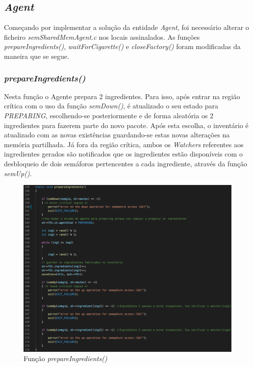 \documentclass[10pt,portuguese]{article}
\begin{document}
\clearpage

\subsection{\textit{Agent}}

\par Começando por implementar a solução da entidade \textit{Agent}, foi necessário alterar o ficheiro \textit{semSharedMemAgent.c} nos locais assinalados. As funções \textit{prepareIngredients()}, \textit{waitForCigarette()} e \textit{closeFactory()} foram modificadas da maneira que se segue.

\subsubsection{\textit{prepareIngredients()}}

\par Nesta função o Agente prepara 2 ingredientes. Para isso, após entrar na região crítica com o uso da função \textit{semDown()}, é atualizado o seu estado para \textit{PREPARING}, escolhendo-se posteriormente e de forma aleatória os 2 ingredientes para fazerem parte do novo pacote. Após esta escolha, o inventário é atualizado com as novas existências guardando-se estas novas alterações na memória partilhada. Já fora da região crítica, ambos os \textit{Watchers} referentes aos ingredientes gerados são notificados que os ingredientes estão disponíveis com o desbloqueio de dois semáforos pertencentes a cada ingrediente, através da função \textit{semUp()}.

\begin{figure}[!h]
    \centering
    \includegraphics[width=\textwidth]{images/implementation/prepareings.png}
    \caption{Função \textit{prepareIngredients()}}
\end{figure}
\end{document}
